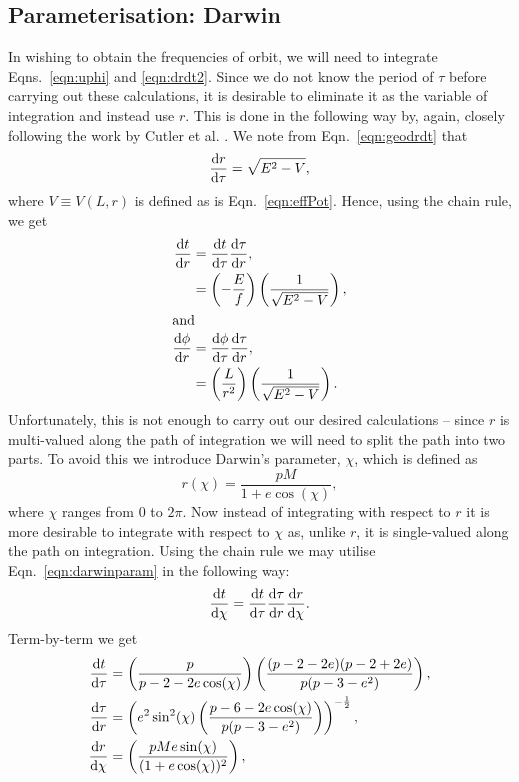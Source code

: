 \subsection{Parameterisation: Darwin}
In wishing to obtain the frequencies of orbit, we will need to integrate Eqns.~\eqref{eqn:uphi} and \eqref{eqn:drdt2}.
Since we do not know the period of $\tau$ before carrying out these calculations, it is desirable to eliminate it as the variable of integration and instead use $r$.
This is done in the following way by, again, closely following the work by Cutler et al. \cite{cutlerEtAl}.
We note from Eqn.~\eqref{eqn:geodrdt} that
\begin{equation}
\dv{r}{\tau}=\sqrt{E^2-V},
\end{equation}
where $V\equiv V(L,r)$ is defined as is Eqn.~\eqref{eqn:effPot}.
Hence, using the chain rule, we get
\begin{align}
    \dv{t}{r}&=\dv{t}{\tau}\dv{\tau}{r},\\
    &=\left(-\frac{E}{f} \right)\left(\frac{1}{\sqrt{E^2-V}} \right),\\
    \intertext{and}
    \dv{\phi}{r}&=\dv{\phi}{\tau}\dv{\tau}{r},\\
    &=\left(\frac{L}{r^2}\right)\left(\frac{1}{\sqrt{E^2-V}} \right).
\end{align}
Unfortunately, this is not enough to carry out our desired calculations -- since $r$ is multi-valued along the path of integration we will need to split the path into two parts.
To avoid this we introduce Darwin's parameter, $\chi$, which is defined as 
\begin{equation}\label{eqn:darwinparam}
r(\chi)=\frac{pM}{1+e\cos(\chi)},
\end{equation}
where $\chi$ ranges from $0$ to $2\pi$.
Now instead of integrating with respect to $r$ it is more desirable to integrate with respect to $\chi$ as, unlike $r$, it is single-valued along the path on integration.
Using the chain rule we may utilise Eqn.~\eqref{eqn:darwinparam} in the following way:
\begin{equation}
\dv{t}{\chi}=\dv{t}{\tau}\dv{\tau}{r}\dv{r}{\chi}.
\end{equation}
Term-by-term we get
\begin{align}
\dv{t}{\tau}&=\left(\frac{p}{p-2-2e\cos(\chi)} \right)\left(\frac{(p-2-2e)(p-2+2e)}{p(p-3-e^2)}\right),\\
\dv{\tau}{r}&=\left(e^2\sin^2(\chi)\left(\frac{p-6-2e\cos(\chi)}{p(p-3-e^2)} \right)\right)^{-\frac{1}{2}},\\
\dv{r}{\chi}&=\left(\frac{pMe\sin(\chi)}{(1+e\cos(\chi))^2} \right),
\end{align}

